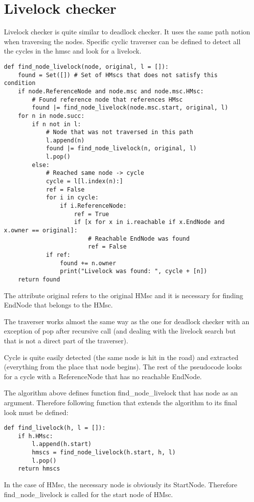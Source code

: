 \documentclass[11pt,oneside]{fithesis2}
\begin{document}
\section{Livelock checker}
Livelock checker is quite similar to deadlock checker. It uses the same path notion when traversing the nodes. Specific cyclic traverser can be defined to detect all the cycles in the hmsc and look for a livelock.
\begin{lstlisting}
def find_node_livelock(node, original, l = []):
    found = Set([]) # Set of HMscs that does not satisfy this condition
    if node.ReferenceNode and node.msc and node.msc.HMsc:
        # Found reference node that references HMsc
        found |= find_node_livelock(node.msc.start, original, l)
    for n in node.succ:
        if n not in l:
            # Node that was not traversed in this path
            l.append(n)
            found |= find_node_livelock(n, original, l)
            l.pop()
        else:
            # Reached same node -> cycle
            cycle = l[l.index(n):]
            ref = False
            for i in cycle:
                if i.ReferenceNode:
                    ref = True
                    if [x for x in i.reachable if x.EndNode and x.owner == original]:
                        # Reachable EndNode was found
                        ref = False
            if ref:
                found += n.owner
                print("Livelock was found: ", cycle + [n])
    return found
\end{lstlisting}

The attribute original refers to the original HMsc and it is necessary for finding EndNode that belongs to the HMsc.

The traverser works almost the same way as the one for deadlock checker with an exception of pop after recursive call (and dealing with the livelock search but that is not a direct part of the traverser).

Cycle is quite easily detected (the same node is hit in the road) and extracted (everything from the place that node begins). The rest of the pseudocode looks for a cycle with a ReferenceNode that has no reachable EndNode.

The algorithm above defines function find\_node\_livelock that has node as an argument. Therefore following function that extends the algorithm to its final look must be defined:
\begin{lstlisting}
def find_livelock(h, l = []):
    if h.HMsc:
        l.append(h.start)
        hmscs = find_node_livelock(h.start, h, l)
        l.pop()
    return hmscs
\end{lstlisting}
In the case of HMsc, the necessary node is obviously its StartNode. Therefore find\_node\_livelock is called for the start node of HMsc.
\end{document}
